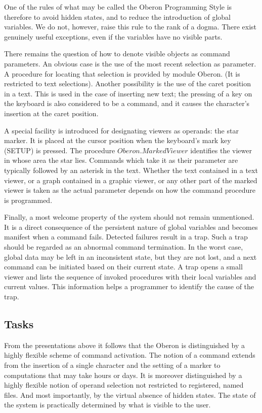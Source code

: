 One of the rules of what may be called the Oberon Programming Style is therefore to avoid hidden
states, and to reduce the introduction of global variables. We do not, however, raise this rule to the
rank of a dogma. There exist genuinely useful exceptions, even if the variables have no visible parts.

There remains the question of how to denote visible objects as command parameters. An obvious
case is the use of the most recent selection as parameter. A procedure for locating that selection is
provided by module Oberon. (It is restricted to text selections). Another possibility is the use of the
caret position in a text. This is used in the case of inserting new text; the pressing of a key on the
keyboard is also considered to be a command, and it causes the character's insertion at the caret position.

A special facility is introduced for designating viewers as operands: the star marker. It is placed at
the cursor position when the keyboard's mark key (SETUP) is pressed. The procedure
$Oberon.MarkedViewer$ identifies the viewer in whose area the star lies. Commands which take it as
their parameter are typically followed by an asterisk in the text. Whether the text contained in a text
viewer, or a graph contained in a graphic viewer, or any other part of the marked viewer is taken as
the actual parameter depends on how the command procedure is programmed.

Finally, a most welcome property of the system should not remain unmentioned. It is a direct
consequence of the persistent nature of global variables and becomes manifest when a command
fails. Detected failures result in a trap. Such a trap should be regarded as an abnormal command
termination. In the worst case, global data may be left in an inconsistent state, but they are not lost,
and a next command can be initiated based on their current state. A trap opens a small viewer and
lists the sequence of invoked procedures with their local variables and current values. This
information helps a programmer to identify the cause of the trap.

\subsection{Tasks}
From the presentations above it follows that the Oberon is distinguished by a highly flexible
scheme of command activation. The notion of a command extends from the insertion of a single
character and the setting of a marker to computations that may take hours or days. It is moreover
distinguished by a highly flexible notion of operand selection not restricted to registered, named
files. And most importantly, by the virtual absence of hidden states. The state of the system is
practically determined by what is visible to the user.

